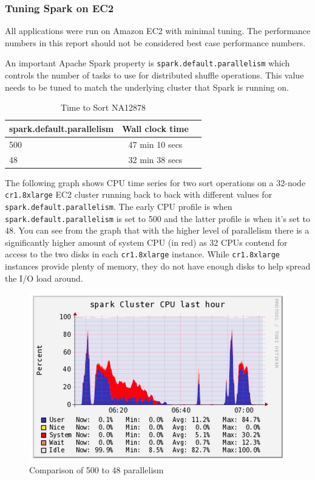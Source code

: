 \documentclass[10pt,twocolumn]{article}
\theoremstyle{plain}
\begin{document}
\subsubsection{Tuning Spark on EC2}

All applications were run on Amazon EC2 with minimal tuning. The performance numbers in this report
should not be considered best case performance numbers.

An important Apache Spark property is \texttt{spark.default.parallelism} which controls the number
of tasks to use for distributed shuffle operations. This value needs to be tuned to match the
underlying cluster that Spark is running on.

\begin{table}[h]
\caption{Time to Sort NA12878}
\label{tab:time-sort-parallelism}
\begin{center}
\begin{tabular}{| l | c | c |}
\hline
\bf \small{spark.default.parallelism} & \bf Wall clock time \\
\hline
500 & 47 min 10 secs \\
48 & 32 min 38 secs \\ 
\hline
\end{tabular}
\end{center}
\end{table}

The following graph shows CPU time series for two sort operations on a 32-node \texttt{cr1.8xlarge}
EC2 cluster running back to back with different values for \texttt{spark.default.parallelism}.
The early CPU profile is when \texttt{spark.default.parallelism} is set to 500 and the latter profile
is when it's set to 48. You can see from the graph that with the higher level of parallelism
there is a significantly higher amount of system CPU (in red) as 32 CPUs contend for access to 
the two disks in each \texttt{cr1.8xlarge} instance. While \texttt{cr1.8xlarge} instances provide
plenty of memory, they do not have enough disks to help spread the I/O load around.

\begin{figure}[h]
\begin{center}
\includegraphics[width=0.9\linewidth]{images/Ganglia CPU Graph.png}
\end{center}
\caption{Comparison of 500 to 48 parallelism}
\label{fig:parallelism}
\end{figure}
\end{document}
